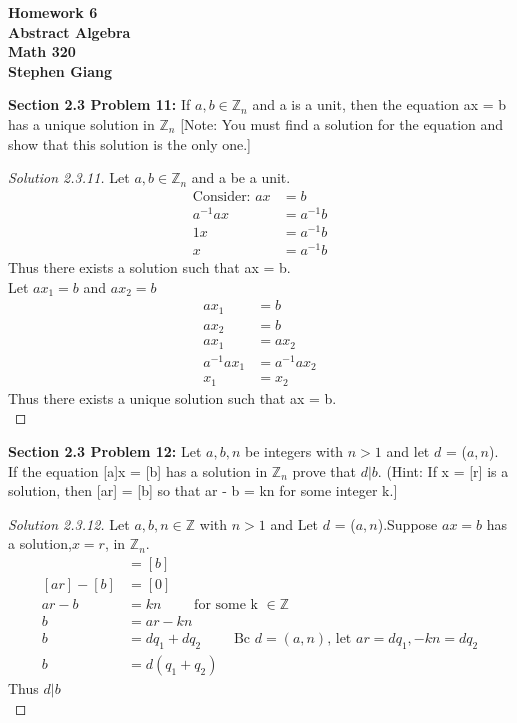 \documentclass[12pt]{article}
\begin{document}
	
	\begin{center}
		\textbf{Homework 6} \\
		\textbf{Abstract Algebra} \\
		\textbf{Math 320} \\
		\textbf{Stephen Giang} \\
	\end{center}

\noindent \textbf{Section 2.3 Problem 11: } If $a,b \in \mathbb{Z}_n$ and a is a unit, then the equation ax = b has a unique solution in $\mathbb{Z}_n$ [Note: You must find a solution for the equation and show that this solution is the only one.] 

\begin{proof}[Solution 2.3.11]
	Let $a,b \in \mathbb{Z}_n$ and a be a unit.
	\begin{align*}
		\text{Consider: } ax &= b \\
		a^{-1} a x &= a^{-1} b \\
		1 x &= a^{-1} b \\
		x &= a^{-1} b
	\end{align*}
	Thus there exists a solution such that ax = b.
	\\
	Let $ax_1 = b$ and $ax_2 = b$
	\begin{align*}
		ax_1 &= b \\
		ax_2 &= b \\
		ax_1 &= ax_2 \\
		a^{-1}ax_1 &= a^{-1}ax_2 \\
		x_1 &= x_2
	\end{align*}
	Thus there exists a unique solution such that ax = b. \\
\end{proof}

\noindent \textbf{Section 2.3 Problem 12: } Let $a,b,n$ be integers with $n > 1$ and let $d$ = ($a, n$). If the equation [a]x = [b] has a solution in $\mathbb{Z}_n$ prove that $d|b$. (Hint: If x = [r] is a solution, then [ar] = [b] so that ar - b = kn for some integer k.] 

\begin{proof}[Solution 2.3.12]
	Let $a,b,n \in \mathbb{Z}$ with $n > 1$ and Let $d$ = ($a, n$).Suppose $ax = b$ has a solution,$x = r$, in $\mathbb{Z}_n$.  
	\begin{align*}
		[a][r] &= [b] \\
		[ar] - [b] &= [0] \\
		ar - b &= kn \qquad \text{ for some k } \in \mathbb{Z}  \\
		b &= ar - kn \\
		b &= dq_1 + dq_2 \qquad \text{ Bc } d = (a, n) \text{, let } ar = dq_1, -kn = dq_2 \\
		b &= d(q_1 + q_2)
	\end{align*}
	Thus $d|b$ \\
\end{proof}
\end{document}

